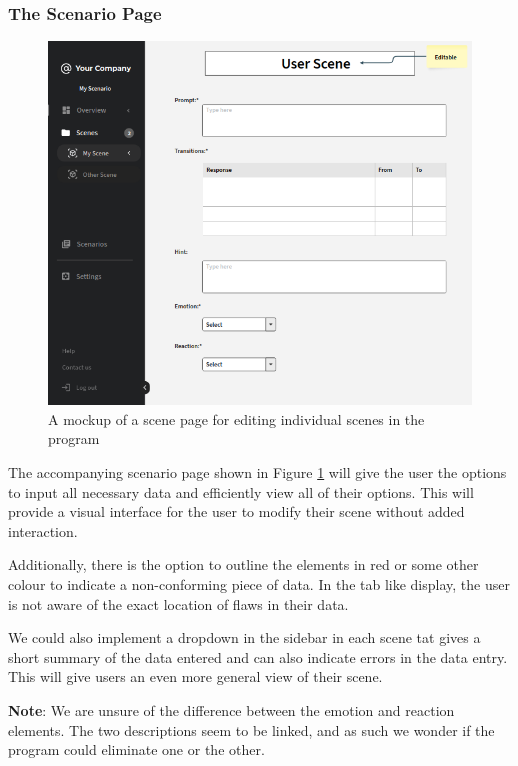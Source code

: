 \documentclass[sigconf]{acmart}
\begin{document}
\subsubsection{The Scenario Page}
\begin{figure}
  \begin{center}
	\includegraphics[scale=0.5]{media/Scene_Page.png}
  \end{center}
\caption{A mockup of a scene page for editing individual scenes in the program}\label{fig2}
\end{figure}
The accompanying scenario page shown in Figure \ref{fig2} will give the user the options to input all necessary data and efficiently view all of their options. This will provide a visual interface for the user to modify their scene without added interaction.

Additionally, there is the option to outline the elements in red or some other colour to indicate a non-conforming piece of data. In the tab like display, the user is not aware of the exact location of flaws in their data.

We could also implement a dropdown in the sidebar in each scene tat gives a short summary of the data entered and can also indicate errors in the data entry. This will give users an even more general view of their scene.

\textbf{Note}: We are unsure of the difference between the emotion and reaction elements. The two descriptions seem to be linked, and as such we wonder if the program could eliminate one or the other.
\end{document}
